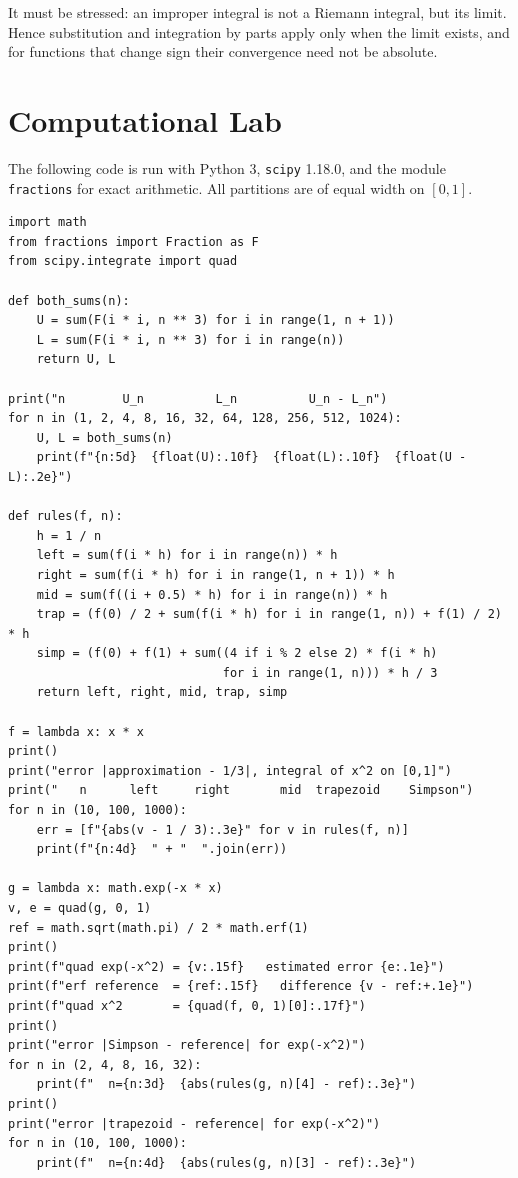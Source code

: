 It must be stressed: an improper integral is not a Riemann integral, but its limit. Hence
substitution and integration by parts apply only when the limit exists, and for functions
that change sign their convergence need not be absolute.

\section{Computational Lab}

The following code is run with Python 3, \texttt{scipy} 1.18.0, and the module
\texttt{fractions} for exact arithmetic. All partitions are of equal width on $[0,1]$.

\begin{lab}
\begin{verbatim}
import math
from fractions import Fraction as F
from scipy.integrate import quad

def both_sums(n):
    U = sum(F(i * i, n ** 3) for i in range(1, n + 1))
    L = sum(F(i * i, n ** 3) for i in range(n))
    return U, L

print("n        U_n          L_n          U_n - L_n")
for n in (1, 2, 4, 8, 16, 32, 64, 128, 256, 512, 1024):
    U, L = both_sums(n)
    print(f"{n:5d}  {float(U):.10f}  {float(L):.10f}  {float(U - L):.2e}")

def rules(f, n):
    h = 1 / n
    left = sum(f(i * h) for i in range(n)) * h
    right = sum(f(i * h) for i in range(1, n + 1)) * h
    mid = sum(f((i + 0.5) * h) for i in range(n)) * h
    trap = (f(0) / 2 + sum(f(i * h) for i in range(1, n)) + f(1) / 2) * h
    simp = (f(0) + f(1) + sum((4 if i % 2 else 2) * f(i * h)
                              for i in range(1, n))) * h / 3
    return left, right, mid, trap, simp

f = lambda x: x * x
print()
print("error |approximation - 1/3|, integral of x^2 on [0,1]")
print("   n      left     right       mid  trapezoid    Simpson")
for n in (10, 100, 1000):
    err = [f"{abs(v - 1 / 3):.3e}" for v in rules(f, n)]
    print(f"{n:4d}  " + "  ".join(err))

g = lambda x: math.exp(-x * x)
v, e = quad(g, 0, 1)
ref = math.sqrt(math.pi) / 2 * math.erf(1)
print()
print(f"quad exp(-x^2) = {v:.15f}   estimated error {e:.1e}")
print(f"erf reference  = {ref:.15f}   difference {v - ref:+.1e}")
print(f"quad x^2       = {quad(f, 0, 1)[0]:.17f}")
print()
print("error |Simpson - reference| for exp(-x^2)")
for n in (2, 4, 8, 16, 32):
    print(f"  n={n:3d}  {abs(rules(g, n)[4] - ref):.3e}")
print()
print("error |trapezoid - reference| for exp(-x^2)")
for n in (10, 100, 1000):
    print(f"  n={n:4d}  {abs(rules(g, n)[3] - ref):.3e}")
\end{verbatim}
\end{lab}

